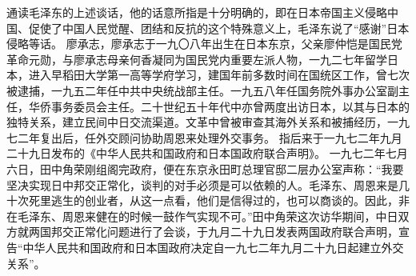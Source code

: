 \begin{maonote}
通读毛泽东的上述谈话，他的话意所指是十分明确的，即在日本帝国主义侵略中国、促使了中国人民觉醒、团结和反抗的这个特殊意义上，毛泽东说了“感谢”日本侵略等话。
廖承志，廖承志于一九〇八年出生在日本东京，父亲廖仲恺是国民党革命元勋，与廖承志母亲何香凝同为国民党内重要左派人物，一九二七年留学日本，进入早稻田大学第一高等学府学习，建国年前多数时间在国统区工作，曾七次被逮捕，一九五二年任中共中央统战部主任。一九五八年任国务院外事办公室副主任，华侨事务委员会主任。二十世纪五十年代中亦曾两度出访日本，以其与日本的独特关系，建立民间中日交流渠道。文革中曾被审查其海外关系和被捕经历，一九七二年复出后，任外交顾问协助周恩来处理外交事务。
指后来于一九七二年九月二十九日发布的《中华人民共和国政府和日本国政府联合声明》。
一九七二年七月六日，田中角荣刚组阁完政府，便在东京永田町总理官邸二层办公室声称：“我要坚决实现日中邦交正常化，谈判的对手必须是可以依赖的人。毛泽东、周恩来是几十次死里逃生的创业者，从这一点看，他们是信得过的，也可以商谈的。因此，非在毛泽东、周恩来健在的时候一鼓作气实现不可。”田中角荣这次访华期间，中日双方就两国邦交正常化问题进行了会谈，于九月二十九日发表两国政府联合声明，宣告“中华人民共和国政府和日本国政府决定自一九七二年九月二十九日起建立外交关系”。
\end{maonote}
